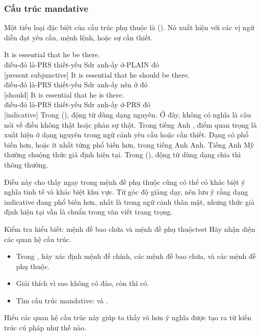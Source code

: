 \subsubsection*{Cấu trúc mandative}

Một tiểu loại đặc biệt của cấu trúc phụ thuộc là  (). Nó xuất hiện với các vị ngữ diễn đạt yêu cầu, mệnh lệnh, hoặc sự cần thiết.

\ea \label{ex:mandative-vi}
    \ea \gll It is essential {\ob}that he be there{\cb}.\\
        điều-đó là-PRS thiết-yếu Sdr anh-ấy ở-PLAIN đó\\
    \glt {} [present subjunctive]
    \ex \gll It is essential {\ob}that he should be there{\cb}.\\
        điều-đó là-PRS thiết-yếu Sdr anh-ấy nên ở đó\\
    \glt {} [should]
    \ex \gll It is essential {\ob}that he is there{\cb}.\\
        điều-đó là-PRS thiết-yếu Sdr anh-ấy ở-PRS đó\\
    \glt {} [indicative]
    \z
\z
Trong  (), động từ dùng dạng nguyên. Ở đây,  không có nghĩa là câu nói về điều không thật hoặc phản sự thật. Trong tiếng Anh , điểm quan trọng là  xuất hiện ở dạng nguyên trong ngữ cảnh yêu cầu hoặc cần thiết. Dạng có  phổ biến hơn, hoặc ít nhất từng phổ biến hơn, trong tiếng Anh Anh. Tiếng Anh Mỹ thường chuộng thức giả định hiện tại. Trong  (), động từ dùng dạng chia thì thông thường.

Điều này cho thấy ngay trong mệnh đề phụ thuộc cũng có thể có khác biệt ý nghĩa tinh tế và khác biệt khu vực. Từ góc độ giảng dạy, nên lưu ý rằng dạng indicative đang phổ biến hơn, nhất là trong ngữ cảnh thân mật, nhưng thức giả định hiện tại vẫn là chuẩn trong văn viết trang trọng.

\begin{tblsframedsymbol}{Kiểm tra hiểu biết: mệnh đề bao chứa và mệnh đề phụ thuộc}{test}
Hãy nhận diện các quan hệ cấu trúc.
\begin{itemize}[noitemsep, leftmargin=*]
    \item Trong , hãy xác định mệnh đề chính, các mệnh đề bao chứa, và các mệnh đề phụ thuộc.
    \item Giải thích vì sao  không có đảo, còn  thì có.
    \item Tìm cấu trúc mandative:  và .
\end{itemize}
Hiểu các quan hệ cấu trúc này giúp ta thấy rõ hơn ý nghĩa được tạo ra từ kiến trúc cú pháp như thế nào.
\end{tblsframedsymbol}


